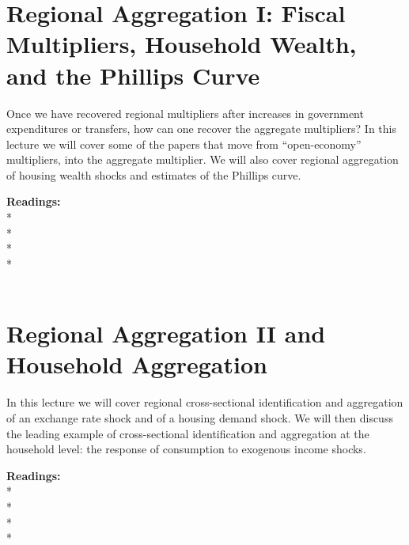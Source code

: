 \documentclass [12pt]{article}
\begin{document}
\section{Regional Aggregation I: Fiscal Multipliers, Household Wealth, and the Phillips Curve}

Once we have recovered regional multipliers after increases in government expenditures or transfers, how can one recover the aggregate multipliers? In this lecture we will cover some of the papers that move from ``open-economy'' multipliers, into the aggregate multiplier. We will also cover regional aggregation of housing wealth shocks and estimates of the Phillips curve.

\noindent\textbf{Readings:}\\
*\\
*\\
* \\
*\\
\\



\section{Regional Aggregation II and Household Aggregation}

In this lecture we will cover regional cross-sectional identification and aggregation of an exchange rate shock and of a housing demand shock. We will then discuss the leading example of cross-sectional identification and aggregation at the household level: the response of consumption to exogenous income shocks.

\noindent\textbf{Readings:}\\
*\\
*\\
*\\
*\\
\\
\\
\\
 \\
 \\
\\
\end{document}
